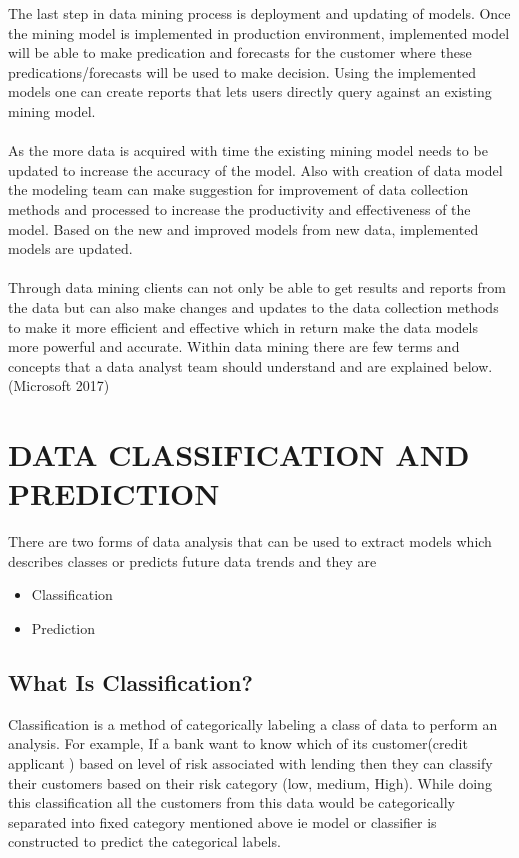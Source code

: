 \documentclass{article}
\begin{document}
The last step in data mining process is deployment and updating of models. Once the mining model is implemented in production environment, implemented model will be able to make predication and forecasts for the customer where these predications/forecasts will be used to make decision. Using the implemented models one can create reports that lets users directly query against an existing mining model.\\\\
As the more data is acquired with time the existing mining model needs to be updated to increase the accuracy of the model. Also with creation of data model the modeling team can make suggestion for improvement of data collection methods and processed to increase the productivity and effectiveness of the model. Based on the new and improved models from new data, implemented models are updated.\\\\
Through data mining clients can not only be able to get results and reports from the data but can also make changes and updates to the data collection methods to make it more efficient and effective which in return make the data models more powerful and accurate. Within data mining there are few terms and concepts that a data analyst team should understand and are explained below.(Microsoft 2017)\pagebreak

\section{DATA CLASSIFICATION AND PREDICTION}\label{classification}

There are two forms of data analysis that can be used to extract models which describes classes or predicts future data trends and they are
\begin{itemize}
\item Classification
\item Prediction
\end{itemize}


\subsection{What Is Classification?}\label{classification}
Classification is a method of categorically labeling a class of data to perform an analysis. For example, 
If a bank want to know which of its customer(credit applicant ) based on level of risk associated with lending then they can classify their customers based on their risk category (low, medium, High). While doing this classification all the customers from this data would be categorically separated into fixed category mentioned above ie model or classifier is constructed to predict the categorical labels.
\end{document}
